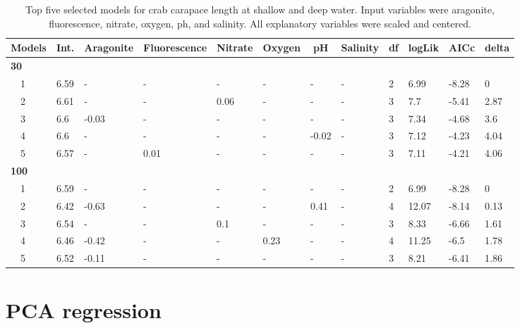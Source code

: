 \documentclass[letterpaper,12pt]{article}\usepackage[]{graphicx}\usepackage[]{color}
\begin{document}
\begin{landscape}
\centering\vspace*{\fill}
\begin{table}[!tbp]
{\scriptsize
\caption{Top five selected models for crab carapace length at shallow and deep water. Input variables were aragonite, fluorescence, nitrate, oxygen, ph, and salinity.  All explanatory variables were scaled and centered.\label{tab:cltab}} 
\begin{center}
\begin{tabular}{llllllllllll}
\hline\hline
\multicolumn{1}{l}{Models}&\multicolumn{1}{c}{Int.}&\multicolumn{1}{c}{Aragonite}&\multicolumn{1}{c}{Fluorescence}&\multicolumn{1}{c}{Nitrate}&\multicolumn{1}{c}{Oxygen}&\multicolumn{1}{c}{pH}&\multicolumn{1}{c}{Salinity}&\multicolumn{1}{c}{df}&\multicolumn{1}{c}{logLik}&\multicolumn{1}{c}{AICc}&\multicolumn{1}{c}{delta}\tabularnewline
\hline
{\bfseries 30}&&&&&&&&&&&\tabularnewline
~~1&6.59&-&-&-&-&-&-&2&6.99&-8.28&0\tabularnewline
~~2&6.61&-&-&0.06&-&-&-&3&7.7&-5.41&2.87\tabularnewline
~~3&6.6&-0.03&-&-&-&-&-&3&7.34&-4.68&3.6\tabularnewline
~~4&6.6&-&-&-&-&-0.02&-&3&7.12&-4.23&4.04\tabularnewline
~~5&6.57&-&0.01&-&-&-&-&3&7.11&-4.21&4.06\tabularnewline
\hline
{\bfseries 100}&&&&&&&&&&&\tabularnewline
~~1&6.59&-&-&-&-&-&-&2&6.99&-8.28&0\tabularnewline
~~2&6.42&-0.63&-&-&-&0.41&-&4&12.07&-8.14&0.13\tabularnewline
~~3&6.54&-&-&0.1&-&-&-&3&8.33&-6.66&1.61\tabularnewline
~~4&6.46&-0.42&-&-&0.23&-&-&4&11.25&-6.5&1.78\tabularnewline
~~5&6.52&-0.11&-&-&-&-&-&3&8.21&-6.41&1.86\tabularnewline
\hline
\end{tabular}\end{center}}
\end{table}

\end{landscape}

\section{PCA regression}
\end{document}
